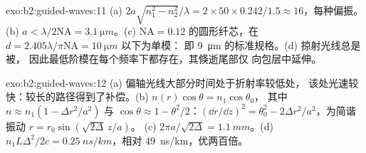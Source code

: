 \begin{solution}{exo:b2:guided-waves:11}
(a) $2a\sqrt{n_1^2 - n_2^2}/\lambda = 2 \times 50 \times 0.242/1.5 \approx 16$，每种偏振。
(b) $a < \lambda/2\mathrm{NA} = \qty{3.1}{\micro m}$。(c)  $\mathrm{NA} =
0.12$ 的圆形纤芯，在 $d = 2.405\lambda/\pi\mathrm{NA} = \qty{10}{\micro m}$ 以下为单模：
即 \qty{9}{\micro m} 的标准规格。(d) 掠射光线总是被，
因此最低阶模在每个频率下都存在，其倏逝尾部仅
向包层中延伸。
\end{solution}

\begin{solution}{exo:b2:guided-waves:12}
(a) 偏轴光线大部分时间处于折射率较低处，
该处光速较快：较长的路径得到了补偿。(b) $n(r)\cos\theta = n_1\cos\theta_0$，
其中 $n \approx n_1(1 - \Delta r^2/a^2)$ 与 $\cos\theta \approx 1 - \theta^2/2$：$(\dd r/\dd z)^2 =
\theta_0^2 - 2\Delta r^2/a^2$，为简谐振动 $r = r_0\sin(\sqrt{2\Delta}\,z/a)$。
(c) $2\pi a/\sqrt{2\Delta} = \qty{1.1}{mm}$。(d) $n_1L\Delta^2/2c = \qty{0.25}{ns/km}$，相对
\qty{49}{ns/km}，优两百倍。
\end{solution}

